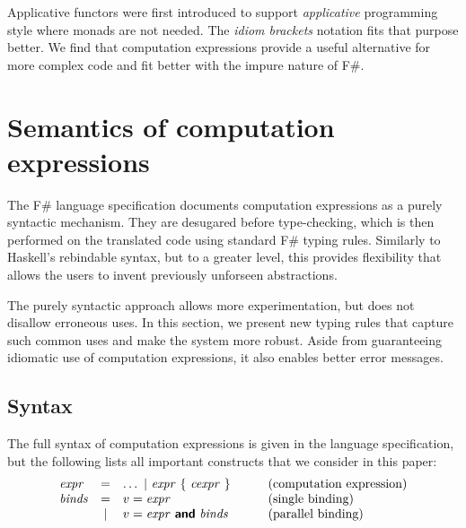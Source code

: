 \documentclass[runningheads,a4paper]{llncs}
\begin{document}
Applicative functors were first introduced to support \emph{applicative} programming style where
monads are not needed. The \emph{idiom brackets} notation \cite{applicative} fits that purpose better. We
find that computation expressions provide a useful alternative for more complex code and fit better 
with the impure nature of F\#.


\section{Semantics of computation expressions}
\label{sec:semantics}

The F\# language specification \cite{fsharp-spec} documents computation expressions as a purely syntactic 
mechanism. They are desugared before type-checking, which is then performed on the translated code 
using standard F\# typing rules. Similarly to Haskell's rebindable syntax, but to a greater level, 
this provides flexibility that allows the users to invent previously unforseen abstractions.

The purely syntactic approach allows more experimentation, but does not disallow erroneous uses.
In this section, we present new typing rules that capture such common uses and make the system more 
robust. Aside from guaranteeing idiomatic use of computation expressions, it also enables better error messages.


\subsection{Syntax}
\label{sec:semantics-syntax}

The full syntax of computation expressions is given in the language specification, but the following
lists all important constructs that we consider in this paper:
%
\begin{equation*}
\begin{array}{lclcl}
\expr  &=& \ldots ~|~ \expr ~\{~ \cexpr ~\}            &\quad&\textnormal{(computation expression)}\\
\binds &=& v=\expr                                          &&\textnormal{(single binding)}\\
       &|& v=\expr ~\kvd{and}~\binds                        &&\textnormal{(parallel binding)}\\
\end{array}
\end{equation*}
\end{document}
